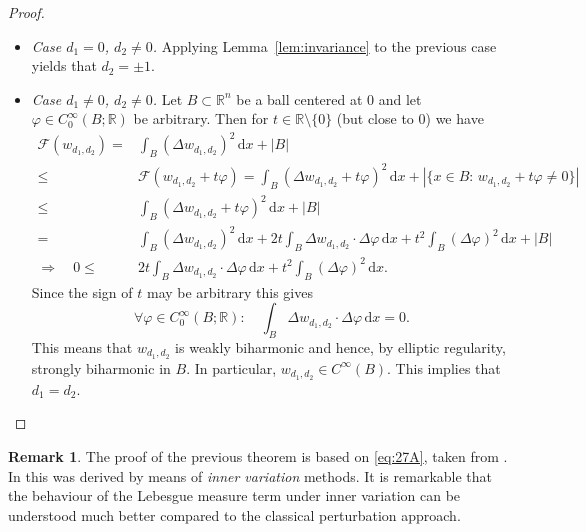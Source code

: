 \documentclass[twoside,11pt]{article}
\theoremstyle{definition}
\newtheorem{remark}{Remark}
\begin{document}
\begin{proof}
\begin{itemize}
		
		\item[(b)]\textit{Case $d_1=0$, $d_2\not=0$.} 
		 Applying Lemma~\ref{lem:invariance} to the previous case yields that $d_2=\pm 1$.
		\item[(c)]\textit{Case $d_1\not=0$, $d_2\not=0$.}
		Let $B \subset \mathbb{R}^n$ be a ball centered at $0$ and let $\varphi \in C_0^\infty(B;\mathbb{R})$ be arbitrary.
		Then for $t\in\mathbb{R}\setminus \{0\}$ (but close to $0$) we have
		\begin{align*}
			{\mathcal F} ( w_{d_1,d_2}) =&\int_B (\Delta w_{d_1,d_2})^2\, \mathrm{d}x +|B|\\
			\le & 	{\mathcal F} ( w_{d_1,d_2}+t\varphi ) =\int_B (\Delta w_{d_1,d_2}+t\varphi)^2\, \mathrm{d}x +|\{x\in B:\, w_{d_1,d_2}+t\varphi\not=0\}|\\
			\le & \int_B (\Delta w_{d_1,d_2}+t\varphi)^2\, \mathrm{d}x + |B|\\
			=&\int_B (\Delta w_{d_1,d_2})^2\, \mathrm{d}x +2t \int_B \Delta w_{d_1,d_2}\cdot \Delta \varphi \, \mathrm{d}x
			+ t^2 \int_B (\Delta \varphi)^2\, \mathrm{d}x+|B|\\
			\Rightarrow \quad 0\le & 2t \int_B \Delta w_{d_1,d_2}\cdot \Delta \varphi \, \mathrm{d}x
			+ t^2 \int_B (\Delta \varphi)^2\, \mathrm{d}x.
		\end{align*}
	Since the sign of $t$ may be arbitrary this gives
	$$
	\forall \varphi \in C_0^\infty(B;\mathbb{R}):\quad \int_B \Delta w_{d_1,d_2}\cdot \Delta \varphi \, \mathrm{d}x=0.
	$$
	This means that $w_{d_1,d_2}$ is weakly biharmonic and hence, by elliptic regularity, strongly biharmonic in $B$. In particular, $w_{d_1,d_2} \in C^\infty(B)$. This implies that $d_1=d_2$. 
	\end{itemize}
	
\end{proof}

\begin{remark}
  The proof of the previous theorem is based on \eqref{eq:27A}, taken from \cite[Lemma 4.4]{DKV20}. In \cite{DKV20} this was derived by means of \emph{inner variation} methods. It is remarkable that the behaviour  of the Lebesgue measure term under inner variation can be understood much better compared to the classical perturbation approach.
\end{remark}
\end{document}
